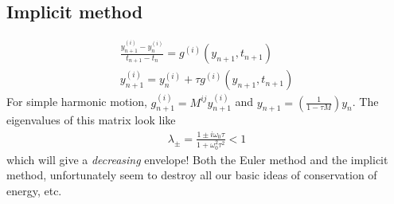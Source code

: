 \documentclass{mathnotes}
\begin{document}
\subsection{Implicit method}
\begin{align*}
    \frac{y_{n+1}^{(i)}-y_n^{(i)}}{t_{n+1}-t_n}=g^{(i)}\left( y_{n+1},t_{n+1} \right)\\
    y_{n+1}^{(i)}=y_n^{(i)}+\tau g^{(i)}\left( y_{n+1},t_{n+1} \right)
\end{align*}
For simple harmonic motion, $g_{n+1}^{(i)}=M^{ij}y_{n+1}^{(i)}$ and $y_{n+1}=\left( \frac{1}{1-\tau M} \right)y_n$.
The eigenvalues of this matrix look like 
\begin{align*}
    \lambda_{\pm}=\frac{1\pm i\omega_0 \tau}{1+\omega_0^2\tau^2}<1
\end{align*}
which will give a \textit{decreasing} envelope! Both the Euler method and the implicit method, unfortunately seem to destroy all our basic ideas of
conservation of energy, etc.
\end{document}
